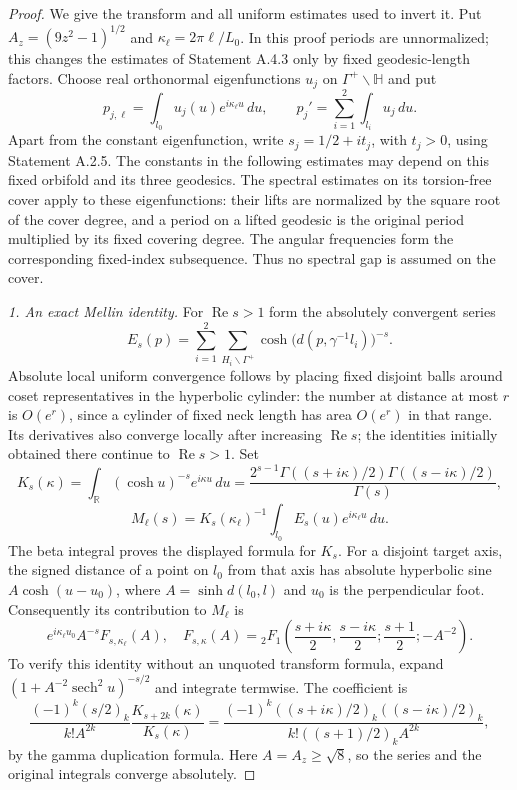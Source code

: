 \begin{proof}
We give the transform and all uniform estimates used to invert it.
Put $A_z=(9z^2-1)^{1/2}$ and $\kappa_\ell=2\pi\ell/L_0$.
In this proof periods are unnormalized; this changes the estimates of
Statement A.4.3 only by fixed geodesic-length factors. Choose real
orthonormal eigenfunctions $u_j$ on $\Gamma^+\backslash\mathbb H$ and put
\[
 p_{j,\ell}=\int_{l_0}u_j(u)e^{i\kappa_\ell u}\,du,
 \qquad p_j'=\sum_{i=1}^2\int_{l_i}u_j\,du.
\]
Apart from the constant eigenfunction, write $s_j=1/2+it_j$, with
$t_j>0$, using Statement A.2.5. The constants in the following estimates
may depend on this fixed orbifold and its three geodesics. The spectral
estimates on its torsion-free cover apply to these eigenfunctions:
their lifts are normalized by the square root of the cover degree,
and a period on a lifted geodesic is the original period multiplied by
its fixed covering degree. The angular frequencies form the corresponding
fixed-index subsequence. Thus no spectral gap is assumed on the cover.

\emph{1. An exact Mellin identity.}
For $\operatorname{Re}s>1$ form the absolutely convergent series
\[
 E_s(p)=\sum_{i=1}^2\sum_{H_i\backslash\Gamma^+}
       \cosh\bigl(d(p,\gamma^{-1}l_i)\bigr)^{-s}.
\]
Absolute local uniform convergence follows by placing fixed disjoint
balls around coset representatives in the hyperbolic cylinder:
the number at distance at most $r$ is $O(e^r)$, since a cylinder
of fixed neck length has area $O(e^r)$ in that range. Its derivatives
also converge locally after increasing $\operatorname{Re}s$; the
identities initially obtained there continue to $\operatorname{Re}s>1$.
Set
\[
 K_s(\kappa)=\int_{\mathbb R}(\cosh u)^{-s}e^{i\kappa u}\,du
 =\frac{2^{s-1}\Gamma((s+i\kappa)/2)\Gamma((s-i\kappa)/2)}{\Gamma(s)},
\]
\[
 M_\ell(s)=K_s(\kappa_\ell)^{-1}
                 \int_{l_0}E_s(u)e^{i\kappa_\ell u}\,du.
\]
The beta integral proves the displayed formula for $K_s$.
For a disjoint target axis, the signed distance of a point on $l_0$
from that axis has absolute hyperbolic sine
$A\cosh(u-u_0)$, where $A=\sinh d(l_0,l)$ and $u_0$ is the
perpendicular foot. Consequently its contribution to $M_\ell$ is
\[
 e^{i\kappa_\ell u_0}A^{-s}F_{s,\kappa_\ell}(A),\quad
 F_{s,\kappa}(A)=
 {}_2F_1\left(\frac{s+i\kappa}{2},\frac{s-i\kappa}{2};
                    \frac{s+1}{2};-A^{-2}\right).
\]
To verify this identity without an unquoted transform formula, expand
$(1+A^{-2}\operatorname{sech}^2u)^{-s/2}$ and integrate termwise.
The coefficient is
\[
 \frac{(-1)^k(s/2)_k}{k!A^{2k}}
      \frac{K_{s+2k}(\kappa)}{K_s(\kappa)}
 =\frac{(-1)^k((s+i\kappa)/2)_k((s-i\kappa)/2)_k}
          {k!((s+1)/2)_k A^{2k}},
\]
by the gamma duplication formula. Here $A=A_z\geq\sqrt8$, so the
series and the original integrals converge absolutely.


\end{proof}
